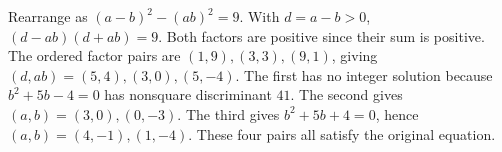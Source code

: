 Rearrange as $(a-b)^2-(ab)^2=9$. With $d=a-b>0$, $(d-ab)(d+ab)=9$. Both factors are positive since their sum is positive. The ordered factor pairs are $(1,9),(3,3),(9,1)$, giving $(d,ab)=(5,4),(3,0),(5,-4)$. The first has no integer solution because $b^2+5b-4=0$ has nonsquare discriminant $41$. The second gives $(a,b)=(3,0),(0,-3)$. The third gives $b^2+5b+4=0$, hence $(a,b)=(4,-1),(1,-4)$. These four pairs all satisfy the original equation.
